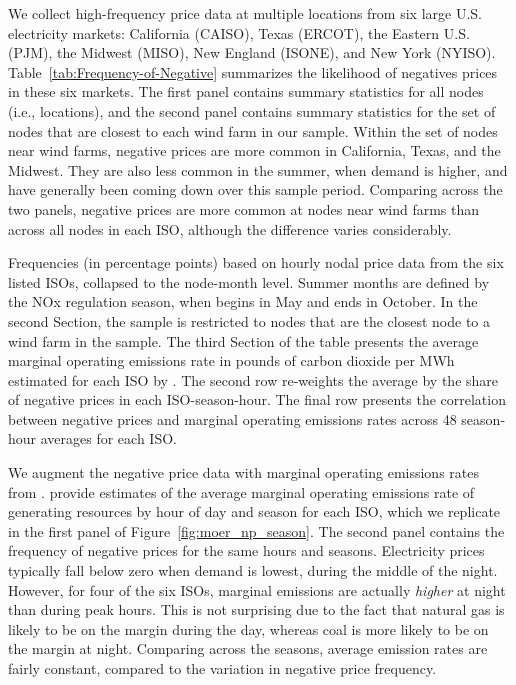 \documentclass[12pt]{article}
\begin{document}
We collect high-frequency price data at multiple locations from six large U.S. electricity markets: California (CAISO), Texas (ERCOT), the Eastern U.S. (PJM), the Midwest (MISO), New England (ISONE), and New York (NYISO). Table~\ref{tab:Frequency-of-Negative} summarizes the likelihood of negatives prices in these six markets. The first panel contains summary statistics for all nodes (i.e., locations), and the second panel contains summary statistics for the set of nodes that are closest to each wind farm in our sample. Within the set of nodes near wind farms, negative prices are more common in California, Texas, and the Midwest. They are also less common in the summer, when demand is higher, and have generally been coming down over this sample period. Comparing across the two panels, negative prices are more common at nodes near wind farms than across all nodes in each ISO, although the difference varies considerably.

\begin{table}[h]
    \caption{Frequency of Negative Prices in Six ISOs (2011-2014)\label{tab:Frequency-of-Negative}}
    \vspace{-15pt}
    \footnotesize
    
    
    Frequencies (in percentage points) based on hourly nodal price data from the six listed ISOs, collapsed to the node-month level. Summer months are defined by the NOx regulation season, when begins in May and ends in October. In the second Section, the sample is restricted to nodes that are the closest node to a wind farm in the sample. The third Section of the table presents the average marginal operating emissions rate in pounds of carbon dioxide per MWh estimated for each ISO by \citet{callaway_location_2018}. The second row re-weights the average by the share of negative prices in each ISO-season-hour. The final row presents the correlation between negative prices and marginal operating emissions rates across 48 season-hour averages for each ISO.
\end{table}

We augment the negative price data with marginal operating emissions rates from \citet{callaway_location_2018}. \citet{callaway_location_2018} provide estimates of the average marginal operating emissions rate of generating resources by hour of day and season for each ISO, which we replicate in the first panel of Figure~\ref{fig:moer_np_season}. The second panel contains the frequency of negative prices for the same hours and seasons. Electricity prices typically fall below zero when demand is lowest, during the middle of the night. However, for four of the six ISOs, marginal emissions are actually \emph{higher} at night than during peak hours. This is not surprising due to the fact that natural gas is likely to be on the margin during the day, whereas coal is more likely to be on the margin at night. Comparing across the seasons, average emission rates are fairly constant, compared to the variation in negative price frequency.
\end{document}
